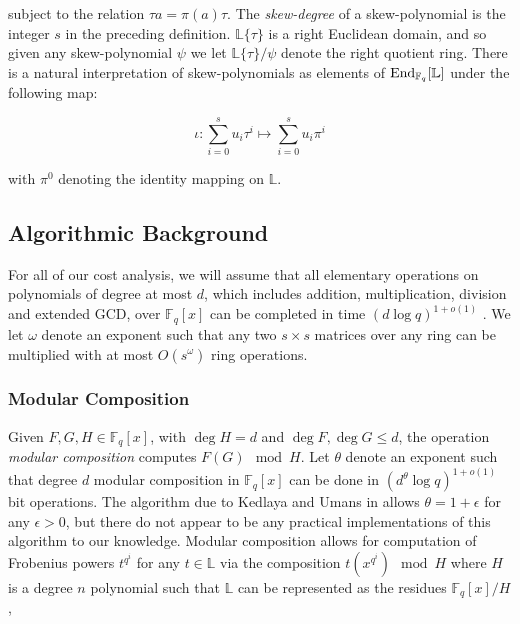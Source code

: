 \documentclass[sigconf]{acmart}
\newcommand{\F}{\mathbb{F}}
\renewcommand{\L}{\mathbb{L}}
\newcommand{\sqdet}{\det}
\begin{document}
subject to the relation $\tau a = \pi(a) \tau$. The \textit{skew-degree} of a skew-polynomial is the integer $s$ in the preceding definition. $\L\{\tau\}$ is a right Euclidean domain, and so given any skew-polynomial $\psi$ we let $\L\{ \tau \}/\psi$ denote the right quotient ring. 
There is a natural interpretation of skew-polynomials as elements of $\textnormal{End}_{\F_q}[\L]$ under the following map:

\begin{equation*}
    \iota : \sum_{i=0}^su_i\tau^i \mapsto \sum_{i=0}^su_i\pi^i 
\end{equation*}

with $\pi^0$ denoting the identity mapping on $\L$.




\subsection{Algorithmic Background}

For all of our cost analysis, we will assume that all elementary operations on polynomials of degree at most $d$, which includes addition, multiplication, division and extended GCD, over $\F_q[x]$ can be completed in time $(d \log q)^{1 + o(1)}$ \cite{vonzurgathen_gerhard_2013}. We let $\omega$ denote an exponent such that any two $s\times s$ matrices over any ring can be multiplied with at most $O(s^{\omega})$ ring operations. 

\subsubsection{Modular Composition} 
Given $F,G,H \in \F_q[x]$, with $\deg H = d$ and $\deg F, \deg G \leq d$, the operation \textit{modular composition} computes $F(G) \mod H$. Let $\theta$ denote an exponent such that degree $d$ modular composition in $\F_q[x]$ can be done in $(d^{\theta} \log q)^{1 + o(1)}$ bit operations. The algorithm due to Kedlaya and Umans in \cite{kedlaya_umans} allows $\theta = 1 + \epsilon$ for any $\epsilon > 0$, but there do not appear to be any practical implementations of this algorithm to our knowledge. Modular composition allows for computation of Frobenius powers $t^{q^i}$ for any $t \in \L$ via the composition $t(x^{q^i}) \mod H$ where $H$ is a degree $n$ polynomial such that $\L$ can be represented as the residues $\F_q[x]/H$, 
\end{document}

